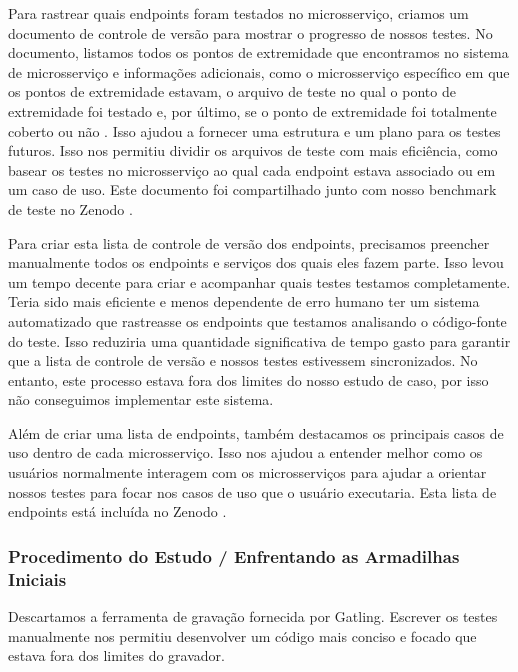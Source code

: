 \begin{tabela}[h]
\begin{tabela}[!t]
Para rastrear quais endpoints foram testados no microsserviço, criamos um documento de controle de versão para mostrar o progresso de nossos testes. No documento, listamos todos os pontos de extremidade que encontramos no sistema de microsserviço e informações adicionais, como o microsserviço específico em que os pontos de extremidade estavam, o arquivo de teste no qual o ponto de extremidade foi testado e, por último, se o ponto de extremidade foi totalmente coberto ou não . Isso ajudou a fornecer uma estrutura e um plano para os testes futuros. Isso nos permitiu dividir os arquivos de teste com mais eficiência, como basear os testes no microsserviço ao qual cada endpoint estava associado ou em um caso de uso. Este documento foi compartilhado junto com nosso benchmark de teste no Zenodo \cite{zenodo_benchmark}.

Para criar esta lista de controle de versão dos endpoints, precisamos preencher manualmente todos os endpoints e serviços dos quais eles fazem parte. Isso levou um tempo decente para criar e acompanhar quais testes testamos completamente. Teria sido mais eficiente e menos dependente de erro humano ter um sistema automatizado que rastreasse os endpoints que testamos analisando o código-fonte do teste. Isso reduziria uma quantidade significativa de tempo gasto para garantir que a lista de controle de versão e nossos testes estivessem sincronizados. No entanto, este processo estava fora dos limites do nosso estudo de caso, por isso não conseguimos implementar este sistema.

Além de criar uma lista de endpoints, também destacamos os principais casos de uso dentro de cada microsserviço. Isso nos ajudou a entender melhor como os usuários normalmente interagem com os microsserviços para ajudar a orientar nossos testes para focar nos casos de uso que o usuário executaria. Esta lista de endpoints está incluída no Zenodo \cite{zenodo_benchmark}.

\subsubsection{Procedimento do Estudo / Enfrentando as Armadilhas Iniciais}

Descartamos a ferramenta de gravação fornecida por Gatling. Escrever os testes manualmente nos permitiu desenvolver um código mais conciso e focado que estava fora dos limites do gravador.


\end{tabela}
\end{tabela}
